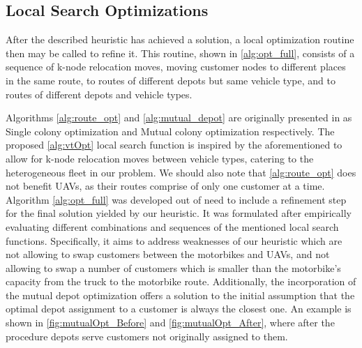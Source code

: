 \documentclass{article}
\begin{document}
	\subsection{Local Search Optimizations}
	After the described heuristic has achieved a solution, a local optimization routine then may be called to refine it. This routine, shown in \ref{alg:opt_full}, consists of a sequence of k-node relocation moves, moving customer nodes to different places in the same route, to routes of different depots but same vehicle type, and to routes of different depots and vehicle types.
	\par
	Algorithms \ref{alg:route_opt} and \ref{alg:mutual_depot} are originally presented in \cite{Stodola2020} as Single colony optimization and Mutual colony optimization respectively. The proposed \ref{alg:vtOpt} local search function is inspired by the aforementioned to allow for k-node relocation moves between vehicle types, catering to the heterogeneous fleet in our problem. We should also note that \ref{alg:route_opt} does not benefit UAVs, as their routes comprise of only one customer at a time. Algorithm \ref{alg:opt_full} was developed out of need to include a refinement step for the final solution yielded by our heuristic. It was formulated after empirically evaluating different combinations and sequences of the mentioned local search functions. Specifically, it aims to address weaknesses of our heuristic which are not allowing to swap customers between the motorbikes and UAVs, and not allowing to swap a number of customers which is smaller than the motorbike's capacity from the truck to the motorbike route. Additionally, the incorporation of the mutual depot optimization offers a solution to the initial assumption that the optimal depot assignment to a customer is always the closest one. An example is shown in \autoref{fig:mutualOpt_Before} and \ref{fig:mutualOpt_After}, where after the procedure depots serve customers not originally assigned to them.
	\begin{algorithm}[h]
		\small
		\caption{$local\_search\_optimization(Sol, n_{max})$}
		\label{alg:opt_full}
	\end{algorithm}
	\begin{algorithm}[h]
		\small
		\caption{$route\_optimization(r, n_{max})$}
		\label{alg:route_opt}
		\;
	\end{algorithm}
\end{document}
